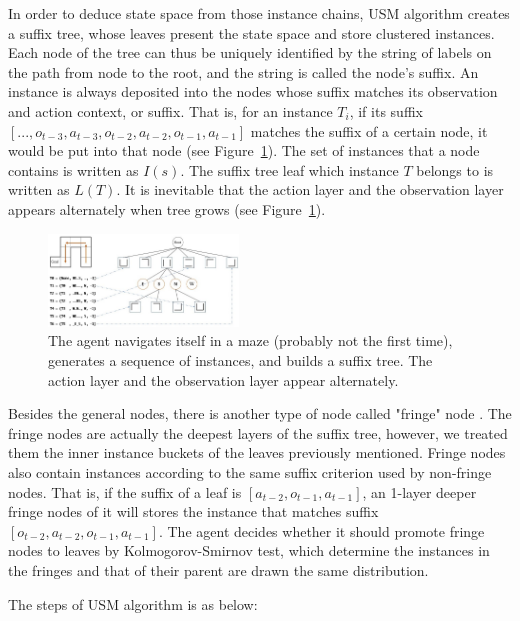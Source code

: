 \documentclass[conference]{IEEEtran}
\begin{document}
	In order to deduce state space from those instance chains, USM algorithm creates a suffix tree,
	whose leaves present the state space and store clustered instances. Each node of the tree
	can thus be uniquely identified by the string of labels on the path from node to the root,
	and the string is called the node’s suffix. An instance is always deposited into the
	nodes whose suffix matches its observation and action context, or suffix. That is,
	for an instance $T_i$, if its suffix $[..., o_{t-3}, a_{t-3}, o_{t-2}, a_{t-2}, o_{t-1}, a_{t-1}]$
	matches the suffix of a certain node, it would be put into that node (see Figure~\ref{fig:suffix tree}).
	The set of instances that a node contains is written as $I(s)$. The suffix tree leaf which
	instance $T$ belongs to is written as $L(T)$. It is inevitable that the action layer and
	the observation layer appears alternately when tree grows (see Figure~\ref{fig:suffix tree}).
	
	\begin{figure}[h]
		\centering
		\includegraphics[width=0.45\textwidth]{usm_sample.jpg}
		\caption{The agent navigates itself in a maze (probably not the first time), generates
			a sequence of instances, and builds a suffix tree. The action layer and
			the observation layer appear alternately.}
		\label{fig:suffix tree}
	\end{figure}
	
	Besides the general nodes, there is another type of node called "fringe" node \cite{mccallum1995instance}.
	The fringe nodes are actually the deepest layers of the suffix tree, however, we treated them
	the inner instance buckets of the leaves previously mentioned. Fringe nodes also contain
	instances according to the same suffix criterion used by non-fringe nodes. That is, 
	if the suffix of a leaf is $[a_{t-2}, o_{t-1}, a_{t-1}]$, an 1-layer deeper fringe nodes of it
	will stores the instance that matches suffix $[o_{t-2}, a_{t-2}, o_{t-1}, a_{t-1}]$. The agent decides
	whether it should promote fringe nodes to leaves by Kolmogorov-Smirnov test, which determine the
	instances in the fringes and that of their parent are drawn the same distribution.
	
	The steps of USM algorithm is as below:
	
\end{document}
